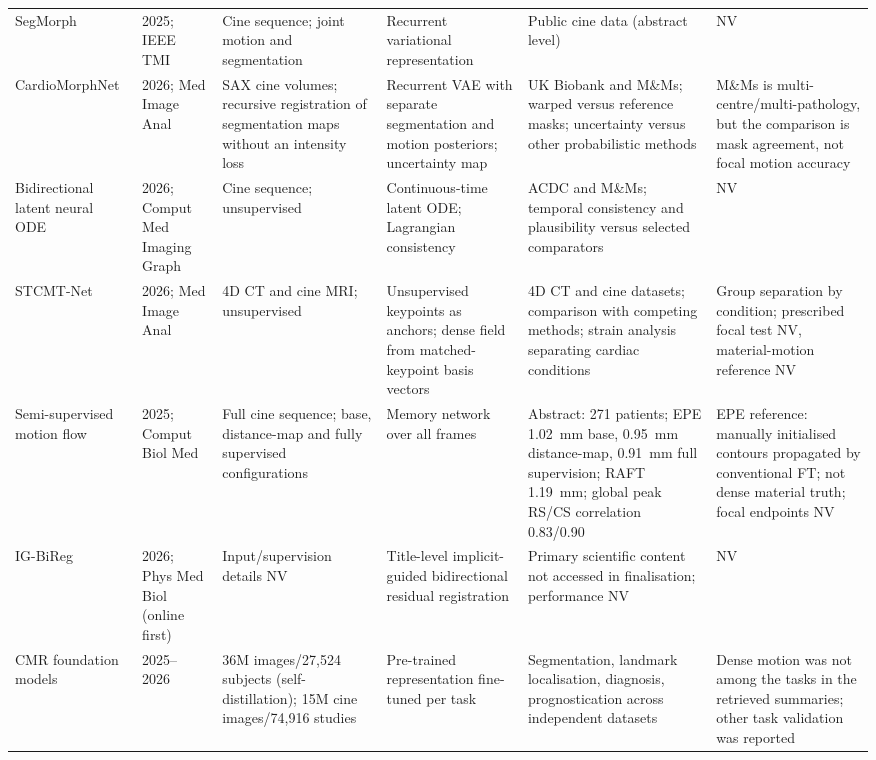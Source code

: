 \documentclass[11pt,a4paper]{article}
\begin{document}
{\begin{longtable}{L{0.11\textwidth}L{0.115\textwidth}L{0.16\textwidth}L{0.185\textwidth}L{0.205\textwidth}L{0.165\textwidth}}
\addlinespace
SegMorph & 2025; IEEE TMI~\cite{bi2025segmorph} & Cine sequence; joint motion and segmentation & Recurrent variational representation & Public cine data (abstract level) & NV \\
\addlinespace
Cardio\-Morph\-Net & 2026; Med Image Anal~\cite{movahed2026cardiomorphnet} & SAX cine volumes; recursive registration of segmentation maps without an intensity loss & Recurrent VAE with separate segmentation and motion posteriors; uncertainty map & UK Biobank and M\&Ms; warped versus reference masks; uncertainty versus other probabilistic methods & M\&Ms is multi-centre/multi-pathology, but the comparison is mask agreement, not focal motion accuracy \\
\addlinespace
Bidirectional latent neural ODE & 2026; Comput Med Imaging Graph~\cite{ruan2026latentode} & Cine sequence; unsupervised & Continuous-time latent ODE; Lagrangian consistency & ACDC and M\&Ms; temporal consistency and plausibility versus selected comparators & NV \\
\addlinespace
STCMT-Net & 2026; Med Image Anal~\cite{qiao2026stcmt} & 4D CT and cine MRI; unsupervised & Unsupervised keypoints as anchors; dense field from matched-keypoint basis vectors & 4D CT and cine datasets; comparison with competing methods; strain analysis separating cardiac conditions & Group separation by condition; prescribed focal test NV, material-motion reference NV \\
\addlinespace
Semi-supervised motion flow & 2025; Comput Biol Med~\cite{portal2025semisup} & Full cine sequence; base, distance-map and fully supervised configurations & Memory network over all frames & Abstract: 271 patients; EPE 1.02~mm base, 0.95~mm distance-map, 0.91~mm full supervision; RAFT 1.19~mm; global peak RS/CS correlation 0.83/0.90 & EPE reference: manually initialised contours propagated by conventional FT; not dense material truth; focal endpoints NV \\
\addlinespace
IG-BiReg & 2026; Phys Med Biol (online first)~\cite{jia2026igbireg} & Input/supervision details NV & Title-level implicit-guided bidirectional residual registration & Primary scientific content not accessed in finalisation; performance NV & NV \\
\addlinespace
CMR foundation models & 2025--2026~\cite{jacob2025cmrfm,fu2026cinema} & 36M images/27,524 subjects (self-distillation); 15M cine images/74,916 studies & Pre-trained representation fine-tuned per task & Segmentation, landmark localisation, diagnosis, prognostication across independent datasets & Dense motion was not among the tasks in the retrieved summaries; other task validation was reported \\

\end{longtable}}
\end{document}
